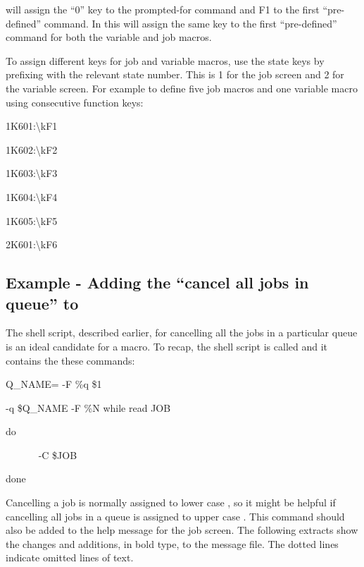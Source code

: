 will assign the ``0'' key to the prompted-for command and F1 to the first ``pre-defined'' command. In \PrBtq{} this will assign the same key to
the first ``pre-defined'' command for both the variable and job macros.

To assign different keys for job and variable macros, use the state keys by prefixing with the relevant state number. This is 1 for the job
screen and 2 for the variable screen. For example to define five job macros and one variable macro using consecutive function keys:

\begin{expara}

1K601:{\textbackslash}kF1

1K602:{\textbackslash}kF2

1K603:{\textbackslash}kF3

1K604:{\textbackslash}kF4

1K605:{\textbackslash}kF5

\bigskip

2K601:{\textbackslash}kF6

\end{expara}

\subsection{Example - Adding the ``cancel all jobs in queue'' to \BtqName}
The shell script, described earlier, for cancelling all the jobs in a particular queue is an ideal candidate for a macro. To recap, the shell
script is called  and it contains the these commands:

\begin{exparasmall}

Q\_NAME={\textasciigrave}\BtjlistName{} -F {\textquotedbl}\%q{\textquotedbl} \$1{\textasciigrave}

\BtjlistName{} -q \$Q\_NAME -F {\textquotedbl}\%N{\textquotedbl} {\textbar} while read JOB

do

\ \ \ \ \ \ \BtjchangeName{} -C \$JOB

done

\end{exparasmall}

Cancelling a job is normally assigned to lower case , so it might be helpful if cancelling all jobs
in a queue is assigned to upper case . This command should also be added to the help message for the job screen.
The following extracts show the changes and additions, in bold type, to the \BtqName{} message file. The dotted lines indicate omitted lines of text.

